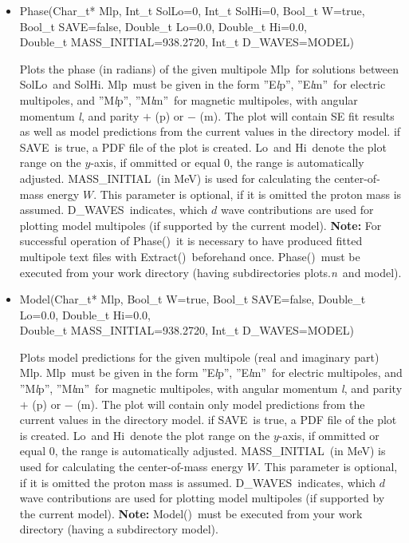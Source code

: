 \documentclass[a4paper,10pt]{article}
\def\tt{\ttfamily}
\def\rm{\rmfamily}
\begin{document}
\begin{itemize}
\item
\tt Phase(Char\_t* Mlp, Int\_t SolLo=0, Int\_t SolHi=0, Bool\_t W=true,\\
\phantom{Phase(}Bool\_t SAVE=false, Double\_t Lo=0.0, Double\_t Hi=0.0,\\
\phantom{Phase(}Double\_t MASS\_INITIAL=938.2720, Int\_t D\_WAVES=MODEL)\rm

Plots the phase (in radians) of the given multipole \tt Mlp\rm\ for solutions between \tt SolLo\rm\ and \tt SolHi\rm.
\tt Mlp\rm\ must be given in the form \tt ''E\textit{l}p''\rm,
\tt ''E\textit{l}m''\rm\ 
for electric multipoles, and
\tt ''M\textit{l}p''\rm,
\tt ''M\textit{l}m''\rm\ 
for magnetic multipoles, with angular momentum \tt\textit{l}\rm, and parity
$+$ (\tt p\rm) or $-$ (\tt m\rm). The plot will contain SE fit results as well as model predictions from the current
values in the directory \tt model\rm.
if \tt SAVE\rm\ is true, a PDF file of the plot is created. \tt Lo\rm\ and \tt Hi\rm\ denote the plot range on the $y$-axis, 
if ommitted or equal 0, the range is automatically adjusted.
\tt MASS\_INITIAL\rm\ (in MeV) is used for calculating the center-of-mass energy $W$. This parameter 
is optional, if it is omitted the proton mass is assumed.
\tt D\_WAVES\rm\ indicates, which $d$ wave contributions are used for plotting model multipoles (if supported by the current model).
\textbf{Note:} For successful operation of \tt Phase()\rm\ it is necessary to have produced
fitted multipole text files with \tt Extract()\rm\ beforehand once. \tt Phase()\rm\ must be executed from your
work directory (having subdirectories \tt plots.\textit{n}\rm\ and \tt model\rm).

\item
\tt Model(Char\_t* Mlp, Bool\_t W=true, Bool\_t SAVE=false, Double\_t Lo=0.0, Double\_t Hi=0.0,\\
\phantom{Model(}Double\_t MASS\_INITIAL=938.2720, Int\_t D\_WAVES=MODEL)\rm

Plots model predictions for the given multipole (real and imaginary part) \tt Mlp\rm.
\tt Mlp\rm\ must be given in the form \tt ''E\textit{l}p''\rm,
\tt ''E\textit{l}m''\rm\ 
for electric multipoles, and
\tt ''M\textit{l}p''\rm,
\tt ''M\textit{l}m''\rm\ 
for magnetic multipoles, with angular momentum \tt\textit{l}\rm, and parity
$+$ (\tt p\rm) or $-$ (\tt m\rm). The plot will contain only model predictions from the current
values in the directory \tt model\rm.
if \tt SAVE\rm\ is true, a PDF file of the plot is created. \tt Lo\rm\ and \tt Hi\rm\ denote the plot range on the $y$-axis, 
if ommitted or equal 0, the range is automatically adjusted.
\tt MASS\_INITIAL\rm\ (in MeV) is used for calculating the center-of-mass energy $W$. This parameter 
is optional, if it is omitted the proton mass is assumed.
\tt D\_WAVES\rm\ indicates, which $d$ wave contributions are used for plotting model multipoles (if supported by the current model).
\textbf{Note:}  \tt Model()\rm\ must be executed from your
work directory (having a subdirectory \tt model\rm).



\end{itemize}
\end{document}
